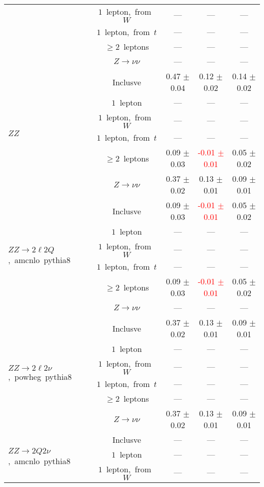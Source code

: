 \documentclass{article}
\begin{document}
\begin{longtable}{|l|c|c|c|c|}
 & $1$~lepton,~from~$W$  & ---  & ---  & --- \\* 
 & $1$~lepton,~from~$t$  & ---  & ---  & --- \\* 
 & $\ge2$~leptons  & ---  & ---  & --- \\* 
 & $Z\rightarrow\nu\nu$  & ---  & ---  & --- \\* 
\hline 
\multirow{6}{*}{$ZZ$} & Inclusve  & 0.47 $\pm$ 0.04  & 0.12 $\pm$ 0.02  & 0.14 $\pm$ 0.02 \\* 
 & $1$~lepton  & ---  & ---  & --- \\* 
 & $1$~lepton,~from~$W$  & ---  & ---  & --- \\* 
 & $1$~lepton,~from~$t$  & ---  & ---  & --- \\* 
 & $\ge2$~leptons  & 0.09 $\pm$ 0.03  & \textcolor{red}{ -0.01 $\pm$ 0.01 }  & 0.05 $\pm$ 0.02 \\* 
 & $Z\rightarrow\nu\nu$  & 0.37 $\pm$ 0.02  & 0.13 $\pm$ 0.01  & 0.09 $\pm$ 0.01 \\* 
\hline 
\multirow{6}{*}{$ZZ{\rightarrow}2{\ell}2Q$,~amcnlo~pythia8} & Inclusve  & 0.09 $\pm$ 0.03  & \textcolor{red}{ -0.01 $\pm$ 0.01 }  & 0.05 $\pm$ 0.02 \\* 
 & $1$~lepton  & ---  & ---  & --- \\* 
 & $1$~lepton,~from~$W$  & ---  & ---  & --- \\* 
 & $1$~lepton,~from~$t$  & ---  & ---  & --- \\* 
 & $\ge2$~leptons  & 0.09 $\pm$ 0.03  & \textcolor{red}{ -0.01 $\pm$ 0.01 }  & 0.05 $\pm$ 0.02 \\* 
 & $Z\rightarrow\nu\nu$  & ---  & ---  & --- \\* 
\hline 
\multirow{6}{*}{$ZZ{\rightarrow}2{\ell}2{\nu}$,~powheg~pythia8} & Inclusve  & 0.37 $\pm$ 0.02  & 0.13 $\pm$ 0.01  & 0.09 $\pm$ 0.01 \\* 
 & $1$~lepton  & ---  & ---  & --- \\* 
 & $1$~lepton,~from~$W$  & ---  & ---  & --- \\* 
 & $1$~lepton,~from~$t$  & ---  & ---  & --- \\* 
 & $\ge2$~leptons  & ---  & ---  & --- \\* 
 & $Z\rightarrow\nu\nu$  & 0.37 $\pm$ 0.02  & 0.13 $\pm$ 0.01  & 0.09 $\pm$ 0.01 \\* 
\hline 
\multirow{6}{*}{$ZZ{\rightarrow}2Q2{\nu}$,~amcnlo~pythia8} & Inclusve  & ---  & ---  & --- \\* 
 & $1$~lepton  & ---  & ---  & --- \\* 
 & $1$~lepton,~from~$W$  & ---  & ---  & --- \\* 

\end{longtable}
\end{document}
